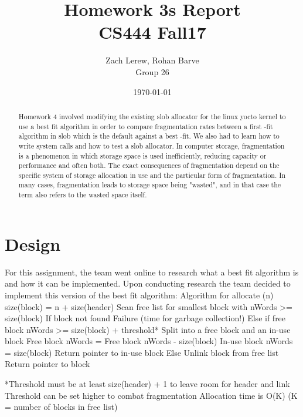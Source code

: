\documentclass[onecolumn, draftclsnofoot,10pt, compsoc]{IEEEtran}
\title{Homework 3s Report\\\large CS444 Fall17}
\author{Zach Lerew, Rohan Barve\\\large Group 26}
\date{\today}
\begin{document}
  \maketitle

	\begin{titlingpage}
		\begin{abstract}
			\noindent Homework 4 involved modifying the existing slob allocator for the linux yocto kernel to use a best fit algorithm in order to compare fragmentation rates between a first -fit algorithm in slob which is the default against a best -fit.  We also had to learn how to write system calls and how to test a slob allocator. In computer storage, fragmentation is a phenomenon in which storage space is used inefficiently, reducing capacity or performance and often both. The exact consequences of fragmentation depend on the specific system of storage allocation in use and the particular form of fragmentation. In many cases, fragmentation leads to storage space being "wasted", and in that case the term also refers to the wasted space itself. 
     
		\end{abstract}
	\end{titlingpage}

  \clearpage
  \singlespace

	\section*{Design}
  For this assignment, the team went online to research what a best fit algorithm is and how it can be implemented. Upon conducting research the team decided to implement this version of the best fit algorithm:
		Algorithm for allocate (n) 
		size(block) = n + size(header) 
		Scan free list for smallest block with nWords >= size(block) 
		If block not found 
   				 Failure (time for garbage collection!) 
		Else if free block nWords >= size(block) + threshold* 
    				Split into a free block and an in-use block 
    				Free block nWords = Free block nWords - size(block) 
    				In-use block nWords = size(block) 
    		Return pointer to in-use block 
	Else 
    		Unlink block from free list 
    		Return pointer to block 
     
*Threshold must be at least size(header) + 1 to leave room for header and link 
Threshold can be set higher to combat fragmentation
Allocation time is O(K) (K = number of blocks in free list)
\end{document}
